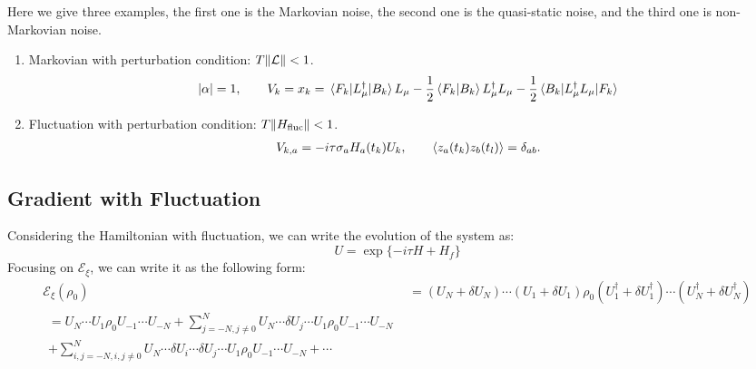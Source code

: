 \documentclass{simple-notes}
\begin{document}
\begin{example}
    Here we give three examples, the first one is the Markovian noise, the second one is the quasi-static noise, and the third one is non-Markovian noise. 
    \begin{enumerate}
    \item Markovian with perturbation condition: $T\norm{\mathcal{L}} < 1$.
    \begin{align*}
        \abs{\alpha} =1, \qquad
        V_k = x_k = \mel{F_k}{L_\mu^\dagger}{B_k}L_\mu -\frac{1}{2}\braket{F_k}{B_k}L_\mu^\dagger L_\mu - \frac{1}{2}\mel{B_k}{L_\mu^\dagger L_\mu}{F_k}
    \end{align*}
    \item Fluctuation with perturbation condition: $T\norm{H_{\text{fluc}}} < 1$.
    \begin{align*}
        V_{k,a} = -i\tau\sigma_a H_a(t_k)U_k, \qquad
        \expval{z_a(t_k)z_b(t_l)} = \delta_{ab}.
    \end{align*}
    \end{enumerate}

\end{example}


\subsection{Gradient with Fluctuation}
Considering the Hamiltonian with fluctuation, we can write the evolution of the system as:
\begin{equation}
    U = \exp\{-i\tau H + H_f\}
\end{equation}
Focusing on $\mathcal{E}_\xi$, we can write it as the following form:
\begin{align}
    \mathcal{E}_\xi(\rho_0) &= (U_N + \delta U_N) \cdots (U_1 + \delta U_1) \rho_0 (U_1^\dagger + \delta U_1^\dagger) \cdots (U_N^\dagger + \delta U_N^\dagger)\\
    \begin{split}
    = U_N \cdots U_1 \rho_0 U_{-1} \cdots U_{-N} + \sum_{j=-N, j\neq 0}^N U_N \cdots \delta U_j \cdots U_1 \rho_0 U_{-1} \cdots U_{-N} \\
    + \sum_{i,j=-N, i,j\neq 0}^N U_N \cdots \delta U_i \cdots \delta U_j \cdots U_1 \rho_0 U_{-1} \cdots U_{-N} + \cdots
    \end{split}\label{eq:fluc_expansion_E}
\end{align}
\end{document}
